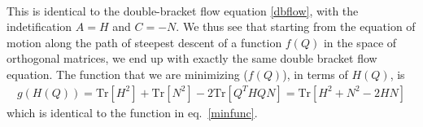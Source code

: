 \documentclass[12pt,twoside]{article}
\numberwithin{equation}{section}
\begin{document}
{\begin{equation}
\begin{aligned}
\end{aligned}\end{equation}
This is identical to the double-bracket flow equation \ref{dbflow}, with the indetification \(A = H\) and \(C = -N\). We thus see that starting from the equation of motion along the path of steepest descent of a function \(f(Q)\) in the space of orthogonal matrices, we end up with exactly the same double bracket flow equation. The function that we are minimizing (\(f(Q)\)), in terms of \(H(Q)\), is 
\begin{equation}\begin{aligned}
	g(H(Q)) = \text{Tr}\left[ H^2 \right] + \text{Tr}\left[ N^2 \right] - 2\text{Tr}\left[ Q^THQN \right] = \text{Tr}\left[ H^2 + N^2  - 2 H N \right] 
\end{aligned}\end{equation}
which is identical to the function in eq.~\ref{minfunc}.

}
\end{document}
